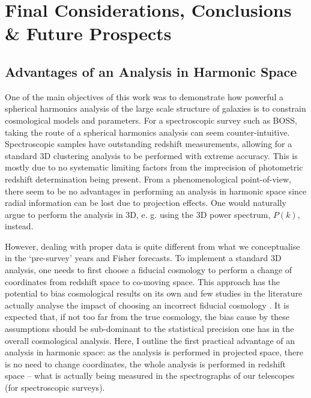 %
\chapter{Final Considerations, Conclusions \& Future Prospects}
\label{Chap:Conclusions}
\label{Chap:Conclusions}


\section{Advantages of an Analysis in Harmonic Space}
\label{sec:conclusion:Harmonic}
One of the main objectives of this work was to demonstrate how powerful a spherical harmonics analysis of the large scale structure of galaxies is to constrain cosmological models and parameters. For a spectroscopic survey such as BOSS, taking the route of a spherical harmonics analysis can seem counter-intuitive. Spectroscopic samples have outstanding redshift measurements, allowing for a standard 3D clustering analysis to be performed with extreme accuracy. This is mostly due to no systematic limiting factors from the imprecision of photometric redshift determination being present. From a phenomenological point-of-view, there seem to be no advantages in performing an analysis in harmonic space since radial information can be lost due to projection effects. One would naturally argue to perform the analysis in 3D, e. g. using the 3D power spectrum, $P(k)$, instead. 

\qquad However, dealing with proper data is quite different from what we conceptualise in the `pre-survey' years and Fisher forecasts. To implement a standard 3D analysis, one needs to first choose a fiducial cosmology to perform a change of coordinates from redshift space to co-moving space. This approach has the potential to bias cosmological results on its own and few studies in the literature actually analyse the impact of choosing an incorrect fiducial cosmology \citep{2017DES-Multiprobe,2018DES-Cov}. It is expected that, if not too far from the true cosmology, the bias cause by these assumptions should be sub-dominant to the statistical precision one has in the overall cosmological analysis. Here, I outline the first practical advantage of an analysis in harmonic space: as the analysis is performed in projected space, there is no need to change coordinates, the whole analysis is performed in redshift space -- what is actually being measured in the spectrographs of our telescopes (for spectroscopic surveys).

